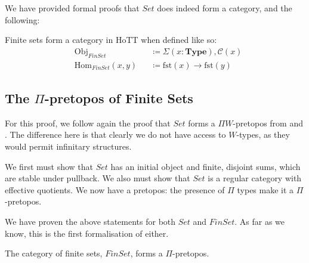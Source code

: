We have provided formal proofs that \(\mathit{Set}\) does indeed form a
category, and the following:
\begin{theorem}
  Finite sets form a category in HoTT when defined like so:
  \begin{equation}
    \begin{alignedat}{3}
      &\text{Obj}_\mathit{FinSet}      &&\coloneqq \Sigma(x : \mathbf{Type}) , \mathcal{C}(x) \\
      &\text{Hom}_\mathit{FinSet}(x , y) &&\coloneqq  \text{fst}(x) \rightarrow \text{fst}(y)
    \end{alignedat}
  \end{equation}
\end{theorem}
\subsection{The \(\Pi\)-pretopos of Finite Sets}
For this proof, we follow again the proof that \(\mathit{Set}\) forms a \(\Pi
W\)-pretopos from \cite[chapter 10]{hottbook} and
\cite{rijkeSetsHomotopyType2015}.
The difference here is that clearly we do not have access to \(W\)-types, as
they would permit infinitary structures.

We first must show that \(\mathit{Set}\) has an initial object and finite,
disjoint sums, which are stable under pullback.
We also must show that \(\mathit{Set}\) is a regular category with effective
quotients.
We now have a pretopos: the presence of \(\Pi\) types make it a
\(\Pi\)-pretopos.

We have proven the above statements for both \(\mathit{Set}\) and
\(\mathit{FinSet}\).
As far as we know, this is the first formalisation of either.
\begin{theorem} \label{finite-topos}
  The category of finite sets, \(\mathit{FinSet}\), forms a \(\Pi\)-pretopos.
\end{theorem}
